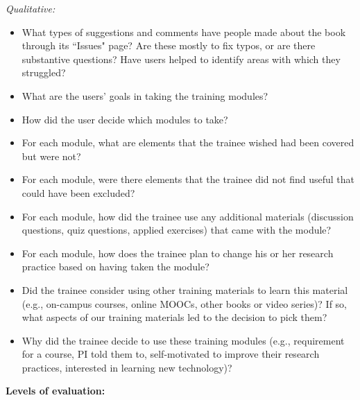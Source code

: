 \documentclass[pdftex,english,11pt,parskip=half]{scrartcl}
\begin{document}
\textit{Qualitative:}

\begin{itemize}
\item What types of suggestions and comments have people made about the book through its ``Issues" page? Are these mostly to fix typos, or are there substantive questions? Have users helped to identify areas with which they struggled?
\item What are the users' goals in taking the training modules?
\item How did the user decide which modules to take?
\item For each module, what are elements that the trainee wished had been covered but were not?
\item For each module, were there elements that the trainee did not find useful that could have been excluded?
\item For each module, how did the trainee use any additional materials (discussion questions, quiz questions, applied exercises) that came with the module?
\item For each module, how does the trainee plan to change his or her research practice based on having taken the module?
\item Did the trainee consider using other training materials to learn this material (e.g., on-campus courses, online MOOCs, other books or video series)? If so, what aspects of our training materials led to the decision to pick them?
\item Why did the trainee decide to use these training modules (e.g., requirement for a course, PI told them to, self-motivated to improve their research practices, interested in learning new technology)?
\end{itemize}

\textbf{Levels of evaluation:}
\end{document}
